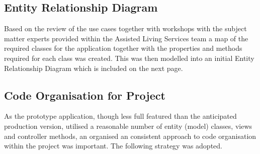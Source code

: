 \documentclass[a4paper,12pt]{article}
\begin{document}
\subsection { Entity Relationship Diagram}
Based on the review of the use cases together with workshops with the subject matter experts provided within the Assisted Living Services team a map of the required classes for the application together with the properties and methods required for each class was created. This was then modelled into an initial Entity Relationship Diagram which is included on the next page.
 

\subsection { Code Organisation for Project}
As the prototype application, though less full featured than the anticipated production version, utilised a reasonable number of entity (model) classes, views and controller methods, an organised an consistent approach to code organisation within the project was important. The following strategy was adopted.
\end{document}
